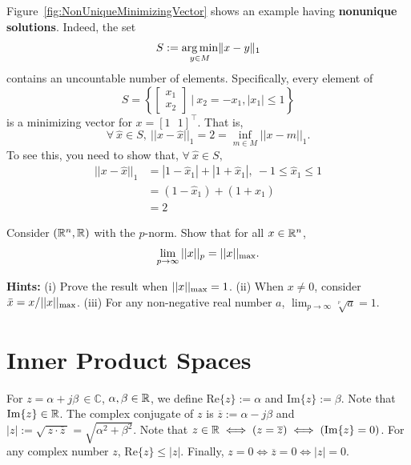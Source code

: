 \begin{rem}
Figure~\ref{fig:NonUniqueMinimizingVector} shows an example having \textbf{nonunique solutions}. Indeed,  the set
$$S:= {\underset{y \in M}{\operatorname*{arg\,min}}} \|x-y\|_1$$
contains an uncountable number of elements. Specifically, every element of
$$S=\left\{ \begin{bmatrix} x_1 \\ x_2 \end{bmatrix}~\big|~ x_2=-x_1, |x_1|\le 1 \right\} $$
is a minimizing vector for $x=[1~~~1]^\top$. That is, 
$$\forall~\widehat{x} \in S,~ ||x - \widehat{x}||_1 = 2 = \inf_{m \in M} ||x-m||_1.$$
To see this, you need to show that, $\forall~\widehat{x} \in S,$
\begin{align*}||x - \widehat{x}||_1 &= |1 - \hat{x}_1| + | 1 + \hat{x}_1|, ~-1 \le  \hat{x}_1 \le 1\\
& = (1 - \hat{x}_1)  +  ( 1 + \hat{x}_1) \\
&=2
\end{align*}
\end{rem}


\begin{exercise} Consider $(\mathbb R^n, \mathbb R)$ with the $p$-norm. Show that for all $x\in \mathbb R^n$, 
$$\lim_{p \to \infty}||x||_p= ||x||_{\rm max}. $$
\end{exercise}

\textbf{Hints:} (i) Prove the result when $||x||_{\rm max} =1$. (ii) When $x\neq 0$, consider $\bar{x} = x /||x||_{\rm max}$. (iii) For any non-negative real number $a$, $\lim_{p\to \infty} \sqrt[^p]{a} =1$.



\section{Inner Product Spaces}

\begin{recall}
For $z = \alpha + j\beta \, \in \mathbb{C}$, $\alpha, \beta \in\mathbb R$, we define $\mathrm{Re}\{z\}:=\alpha$ and  $\mathrm{Im}\{z\}:=\beta$. Note that $\mathrm{Im}\{z\}\in \mathbb R$. The complex conjugate of $z$ is $\overline{z} := \alpha -  j\beta$ and $|z| := \sqrt{\ z \cdot \overline{z}~ }= \sqrt{\alpha^2 + \beta^2}$.  Note that $z \in \mathbb R \iff (z = \overline{z}) \iff (\mathrm{Im}\{z\}=0)$.  For any complex number $z$, $\mathrm{Re}\{z\} \le |z|$. Finally, $ z = 0 \iff \overline{z} = 0 \iff |z|=0$.
\end{recall}

